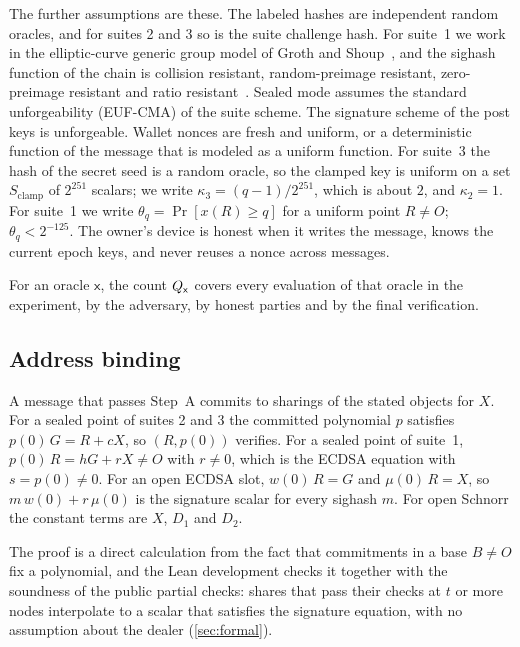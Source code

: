 The further assumptions are these. The labeled hashes are independent random oracles, and for suites 2 and 3 so is the suite challenge hash. For suite~1 we work in the elliptic-curve generic group model of Groth and Shoup~\cite[Section~2]{GS21}, and the sighash function of the chain is collision resistant, random-preimage resistant, zero-preimage resistant and ratio resistant~\cite[Definitions 3, 4, 5, 7]{GS21}. Sealed mode assumes the standard unforgeability (EUF-CMA) of the suite scheme. The signature scheme of the post keys is unforgeable. Wallet nonces are fresh and uniform, or a deterministic function of the message that is modeled as a uniform function. For suite~3 the hash of the secret seed is a random oracle, so the clamped key is uniform on a set $S_{\mathrm{clamp}}$ of $2^{251}$ scalars; we write $\kappa_3 = (q-1)/2^{251}$, which is about $2$, and $\kappa_2 = 1$. For suite~1 we write $\theta_q = \Pr[x(R) \ge q]$ for a uniform point $R \neq O$; $\theta_q < 2^{-125}$. The owner's device is honest when it writes the message, knows the current epoch keys, and never reuses a nonce across messages.

For an oracle $\mathsf{x}$, the count $Q_{\mathsf{x}}$ covers every evaluation of that oracle in the experiment, by the adversary, by honest parties and by the final verification.

\subsection{Address binding}

\begin{proposition}\label{prop:binding}
A message that passes Step~A commits to sharings of the stated objects for $X$. For a sealed point of suites 2 and 3 the committed polynomial $p$ satisfies $p(0)\,G = R + cX$, so $(R, p(0))$ verifies. For a sealed point of suite~1, $p(0)\,R = hG + rX \neq O$ with $r \neq 0$, which is the ECDSA equation with $s = p(0) \neq 0$. For an open ECDSA slot, $w(0)\,R = G$ and $\mu(0)\,R = X$, so $m\,w(0) + r\,\mu(0)$ is the signature scalar for every sighash $m$. For open Schnorr the constant terms are $X$, $D_1$ and $D_2$.
\end{proposition}

The proof is a direct calculation from the fact that commitments in a base $B \neq O$ fix a polynomial, and the Lean development checks it together with the soundness of the public partial checks: shares that pass their checks at $t$ or more nodes interpolate to a scalar that satisfies the signature equation, with no assumption about the dealer (\cref{sec:formal}).

